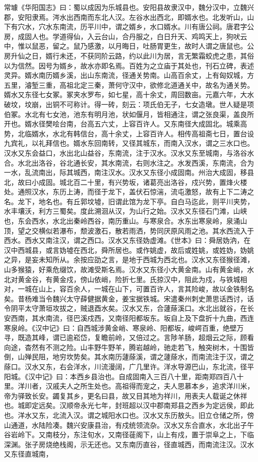 \documentclass[12pt,UTF8]{ctexbook}
\begin{document}
常璩《华阳国志》曰：蜀以成因为乐城县也。安阳县故隶汉中，魏分汉中，立魏兴郡，安阳隶焉。涔水出西南而东北人汉。左谷水出西北，即婿水也。北发听山，山下有穴水，穴水东南流，历平川中，谓之婿乡，水口婿水。川有唐公祠。唐君字公房，成固人也。学道得仙，入云台山，合丹服之，白日升天、鸡鸣天上，狗吠云中，惟以鼠恶，留之。鼠乃感激，以月晦日，吐肠胃更生，故时人谓之唐鼠也。公房升仙之日，婿行未还，不获同阶云路，约以此川为居，言无繁霜蛟虎之患，其俗以为信然。因号为婿乡，故水亦即名焉。百姓为之立庙于其处也，刊石立碑，表述灵异。婿水南历婿乡溪，出山东南流，径通关势南。山高百余丈，上有匈奴城，方五里，濬堑三重，高祖北定三秦，萧何守汉中，欲修北道通关中，故名为通关势。婿水又东径七女冢。冢夹水罗布，如七星，高十余丈，周回数亩。元嘉六年，大水破坟，坟崩，出铜不可称计。得一砖，刻云：项氏伯无子，七女造墩。世人疑是项伯冢。水北有七女池，池东有明月池，状如偃月，皆相通注，谓之张良渠，盖良所开也。婿水径樊哙台南，台高五六丈，上容百许人。又东南径大成固北。城乘高势，北临婿水，水北有韩信台，高十余丈，上容百许人。相传高祖斋七日，置台设九宾礼，以礼拜信也。婿水东回南转，又径其城东，而南入汉水，谓之三水口也。汉水又东会益口，水出北山益谷，东南流，注于汉水。汉水又东至城南，与洛谷水合。水北出洛谷，谷北通长安，其水南流，右则水注之。水发西溪，东南流，合为一水，乱流南出，际其城西，南注汉水。汉水又东径小成固南。州治大成固，移县北，故曰小成固。城北百二十里，有兴势坂，诸葛亮出洛谷，戍兴势，置烽火楼处。通照汉水，东历上涛，而径于龙下，盖伏石惊湍，流屯激怒，故有上下二涛之名。龙下，地名也。有丘郭坟墟，旧谓此馆为龙下亭。自白马迄此，则平川夹势，水丰壤沃，利方三蜀矣。度此溯洄从汉，为山行之始。汉水又东径石门滩，山峡也，东会西水，水北出秦岭西谷，南历重山。与寒泉合。水东出寒泉岭，泉涌山顶，望之交横似若瀑布，颓波激石，散若雨洒，势同厌原风雨之池。其水西流入于西水。西水又南注汉，谓之西口。汉水又东径妫虚滩。《世本》曰：舜居妫汭，在汉中西城县，或言妫墟在西北，舜所居也。或作姚虚，故后或姓姚，或姓妫，妫姚之异，是妄未知所从。余按应劭之言，是地于西城为西北也。汉水又东径猴径滩，山多猴猿，好乘危缀饮，故滩受斯名焉。汉水又东径小大黄金南。山有黄金峭，水北对黄金谷，有黄金戍，傍山依峭，险折七里。氏掠汉中，阻此为戍，与铁城相对，一城在山上，容百余人，一城在山下，可置百许人，言其险峻，故以金铁制名矣。昔杨难当令魏兴太守薛健据黄金，姜宝据铁城。宋遣秦州刺史萧思话西讨，话令阴平太守萧垣攻拔之，贼退酉水矣。汉水又东，合蘧蒢溪口。水北出就谷，在长安西南，其水南流，径巴溪戍西，又南径阳都坂东。坂自上及下盘折十九曲，西连寒泉岭。《汉中记》曰：自西城涉黄金峭、寒泉岭、阳都坂，峻崿百重，绝壁万寻，既造其峰，谓已逾崧岱，复瞻前岭，又倍过之。言陟羊肠，超烟云之际，顾看向途，杳然有不测之险。山丰野牛野羊，腾岩越岭，驰走若飞，触突树木，十围皆倒，山殚民阻，地穷坎势矣。其水南历蘧蒢溪，谓之蘧蒢水，而南流注于汉，谓之蒢口。汉水又东，右会洋水，川流漫阔，广几里许。洋水导源巴山，东北流，径平阳城。《汉中记》曰：本西乡县治也。自成固南入三百八十里，距南郑四百八十里。洋川者，汉戚夫人之所生处也。高祖得而宠之，夫人思慕本乡，追求洋川米，帝为驿致长安。蠲复其乡，更名曰县，故又目其地为祥川，用表夫人载诞之休祥也。城即定远矣。汉顺帝永光七年，封班超以汉中郡南郑县之西乡为定远侯，即此也。洋水又东，北流入汉。谓之城阳水口也。汉水又东历敖头。旧立仓储之所，傍山通道，水陆险凑。魏兴安康县治，有戍统领流杂。汉水又东合直水，水北出子午谷岩岭下。又南枝分，东注旬水，又南径蓰阁下，山上有戍，置于崇阜之上，下临深渊。张子房烧绝栈阁，示无还也。又东南历直谷，径直城西，而南流注汉。汉水又东径直城南，
\end{document}

